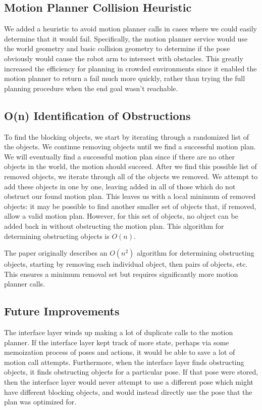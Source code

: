 \documentclass[12pt]{article}
\begin{document}
\subsection{Motion Planner Collision Heuristic}

We added a heuristic to avoid motion planner calls in cases where we could easily determine that it would fail.
Specifically, the motion planner service would use the world geometry and basic collision geometry to determine if the pose obviously would cause the robot arm to intersect with obstacles.
This greatly increased the efficiency for planning in crowded environments since it enabled the motion planner to return a fail much more quickly, rather than trying the full planning procedure when the end goal wasn't reachable. 

\subsection{O(n) Identification of Obstructions}

To find the blocking objects, we start by iterating through a randomized list of the objects.  
We continue removing objects until we find a successful motion plan.  
We will eventually find a successful motion plan since if there are no other objects in the world, the motion should succeed.  
After we find this possible list of removed objects, we iterate through all of the objects we removed.  
We attempt to add these objects in one by one, leaving added in all of those which do not obstruct our found motion plan.  
This leaves us with a local minimum of removed objects: it may be possible to find another smaller set of objects that, if removed, allow a valid motion plan.  
However, for this set of objects, no object can be added back in without obstructing the motion plan.
This algorithm for determining obstructing objects is $O(n)$.

The paper originally describes an $O(n^2)$ algorithm for determining obstructing objects, starting by removing each individual object, then pairs of objects, etc.  
This ensures a minimum removal set but requires significantly more motion planner calls.

\subsection{Future Improvements}

The interface layer winds up making a lot of duplicate calls to the motion planner.
If the interface layer kept track of more state, perhaps via some memoization process of poses and actions, it would be able to save a lot of motion call attempts.
Furthermore, when the interface layer finds obstructing objects, it finds obstructing objects for a particular pose.  
If that pose were stored, then the interface layer would never attempt to use a different pose which might have different blocking objects, and would instead directly use the pose that the plan was optimized for.
\end{document}
